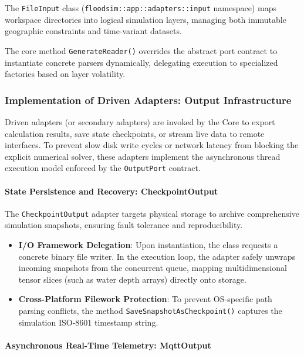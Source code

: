 The \texttt{FileInput} class (\texttt{floodsim::app::adapters::input} namespace) maps \\ workspace directories into logical simulation layers, managing both immutable geographic constraints and time-variant datasets.

The core method \texttt{GenerateReader()} overrides the abstract port contract to instantiate concrete parsers dynamically, delegating execution to specialized factories based on layer volatility.

\subsubsection{Implementation of Driven Adapters: Output Infrastructure}
\label{subsec:output_adapters_implementation}

Driven adapters (or secondary adapters) are invoked by the Core to export calculation results, save state checkpoints, or stream live 
data to remote interfaces. To prevent slow disk write cycles or network latency from blocking the explicit numerical solver, these 
adapters implement the asynchronous thread execution model enforced by the \texttt{OutputPort} contract.

\paragraph{State Persistence and Recovery: CheckpointOutput}

The \texttt{CheckpointOutput} adapter targets physical storage to archive comprehensive simulation snapshots, ensuring fault tolerance 
and reproducibility.

\begin{itemize}
    \item \textbf{I/O Framework Delegation}: Upon instantiation, the class requests a concrete binary file writer. In the execution loop, the adapter safely unwraps incoming snapshots from 
    the concurrent queue, mapping multidimensional tensor slices (such as water depth arrays) directly onto storage.
    
    \item \textbf{Cross-Platform Filework Protection}: To prevent OS-specific path parsing conflicts, the method 
    \texttt{SaveSnapshotAsCheckpoint()} captures the simulation ISO-8601 timestamp string.
\end{itemize}

\paragraph{Asynchronous Real-Time Telemetry: MqttOutput}

